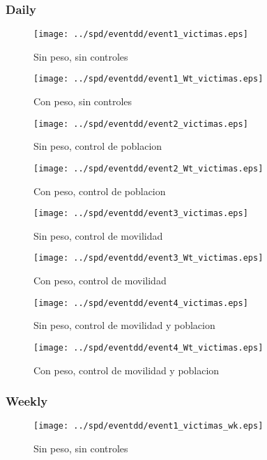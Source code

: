 \documentclass[11pt,letterpaper]{article}
\begin{document}
		\subsubsection{Daily}
\begin{figure}[hbtp]
\caption{Sin peso, sin controles}
\centering
\texttt{[image: ../spd/eventdd/event1\_victimas.eps]}
\end{figure}

\begin{figure}[hbtp]
\caption{Con peso, sin controles}
\centering
\texttt{[image: ../spd/eventdd/event1\_Wt\_victimas.eps]}
\end{figure}
\begin{figure}[hbtp]
\caption{Sin peso, control de poblacion}
\centering
\texttt{[image: ../spd/eventdd/event2\_victimas.eps]}
\end{figure}

\begin{figure}[hbtp]
\caption{Con peso, control de poblacion}
\centering
\texttt{[image: ../spd/eventdd/event2\_Wt\_victimas.eps]}
\end{figure}
\begin{figure}[hbtp]
\caption{Sin peso, control de movilidad}
\centering
\texttt{[image: ../spd/eventdd/event3\_victimas.eps]}
\end{figure}

\begin{figure}[hbtp]
\caption{Con peso, control de movilidad}
\centering
\texttt{[image: ../spd/eventdd/event3\_Wt\_victimas.eps]}
\end{figure}
\begin{figure}[hbtp]
\caption{Sin peso, control de movilidad y poblacion}
\centering
\texttt{[image: ../spd/eventdd/event4\_victimas.eps]}
\end{figure}

\begin{figure}[hbtp]
\caption{Con peso, control de movilidad y poblacion}
\centering
\texttt{[image: ../spd/eventdd/event4\_Wt\_victimas.eps]}
\end{figure}

		\subsubsection{Weekly}
\begin{figure}[hbtp]
\caption{Sin peso, sin controles}
\centering
\texttt{[image: ../spd/eventdd/event1\_victimas\_wk.eps]}
\end{figure}
\end{document}
